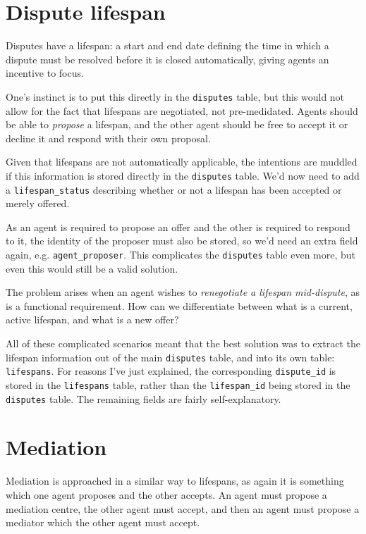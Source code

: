 \section{Dispute lifespan}

Disputes have a lifespan: a start and end date defining the time in which a dispute must be resolved before it is closed automatically, giving agents an incentive to focus.

One's instinct is to put this directly in the \lstinline{disputes} table, but this would not allow for the fact that lifespans are negotiated, not pre-medidated. Agents should be able to \emph{propose} a lifespan, and the other agent should be free to accept it or decline it and respond with their own proposal.

Given that lifespans are not automatically applicable, the intentions are muddled if this information is stored directly in the \lstinline{disputes} table. We'd now need to add a \lstinline{lifespan_status} describing whether or not a lifespan has been accepted or merely offered.

As an agent is required to propose an offer and the other is required to respond to it, the identity of the proposer must also be stored, so we'd need an extra field again, e.g. \lstinline{agent_proposer}. This complicates the \lstinline{disputes} table even more, but even this would still be a valid solution.

The problem arises when an agent wishes to \emph{renegotiate a lifespan mid-dispute}, as is a functional requirement. How can we differentiate between what is a current, active lifespan, and what is a new offer?

All of these complicated scenarios meant that the best solution was to extract the lifespan information out of the main \lstinline{disputes} table, and into its own table: \lstinline{lifespans}. For reasons I've just explained, the corresponding \lstinline{dispute_id} is stored in the \lstinline{lifespans} table, rather than the \lstinline{lifespan_id} being stored in the \lstinline{disputes} table. The remaining fields are fairly self-explanatory.

\section{Mediation}

Mediation is approached in a similar way to lifespans, as again it is something which one agent proposes and the other accepts. An agent must propose a mediation centre, the other agent must accept, and then an agent must propose a mediator which the other agent must accept.

